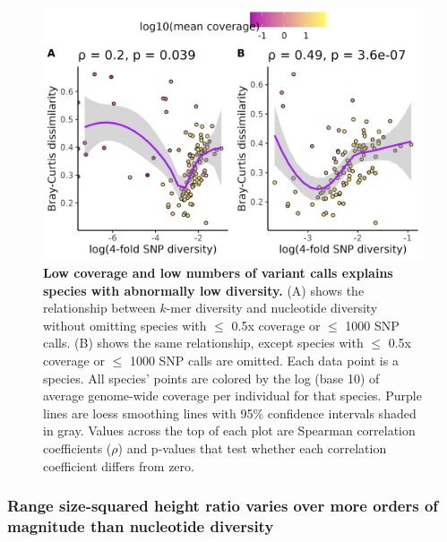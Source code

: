 \documentclass[12pt]{article}
\begin{document}
\begin{figure}
    \centering
    \includegraphics[width=\textwidth]{figures/chapter_2/pi_vs_bcd_high_vs_low_cov_2025-01-08.jpg}
    \caption{\textbf{Low coverage and low numbers of variant calls explains species with abnormally low diversity.} (A) shows the relationship between $k$-mer diversity and nucleotide diversity without omitting species with $\leq$ 0.5x coverage or $\leq$ 1000 SNP calls. (B) shows the same relationship, except species with $\leq$ 0.5x coverage or $\leq$ 1000 SNP calls are omitted. Each data point is a species. All species' points are colored by the log (base 10) of average genome-wide coverage per individual for that species. Purple lines are loess smoothing lines with 95\% confidence intervals shaded in gray. Values across the top of each plot are Spearman correlation coefficients ($\rho$) and p-values that test whether each correlation coefficient differs from zero.}
    \label{fig:pivskmer}
\end{figure}

\vspace{12pt}

\subsubsection*{Range size-squared height ratio varies over more orders of magnitude than nucleotide diversity}
\end{document}
